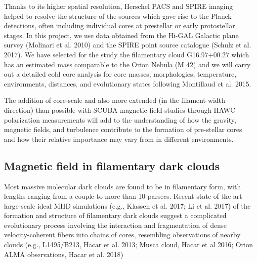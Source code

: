 \documentclass[11pt]{amsart}
\begin{document}
Thanks to its higher spatial resolution, 
Herschel PACS and SPIRE imaging
helped to resolve
the structure of the
sources which gave rise to the Planck detections, often including 
individual cores at prestellar or early protostellar stages.
In this project, we use data obtained from the Hi-GAL Galactic
plane survey (Molinari et al. 2010) and the SPIRE point source catalogue (Schulz et al. 2017). 
We have selected for the study the filamentary cloud G16.97+00.27 which has an estimated mass comparable to the 
Orion Nebula (M 42) and we will carry out a detailed cold core analysis for 
core masses, morphologies, temperature, environments, distances, and evolutionary states following Montillaud et al. 2015.

The addition of core-scale and also more extended (in the filament width direction) than possible with SCUBA magnetic field studies through HAWC+ polarization
measurements will add to the understanding of how the gravity, magnetic
fields, and turbulence contribute to the formation of pre-stellar cores and how their relative importance may vary from
in different environments.

\subsection{Magnetic field in filamentary dark clouds}

Most massive molecular dark clouds are found to be in filamentary form, with lengths ranging from a couple to more than 10 parsecs. 
Recent state-of-the-art large-scale ideal MHD simulations (e.g., Klassen et al. 2017; Li et al. 2017) of the formation and structure 
of filamentary dark clouds suggest a complicated evolutionary process involving the interaction and fragmentation of 
dense velocity-coherent fibers into chains of cores, resembling observations of nearby clouds (e.g., L1495/B213, Hacar et al. 2013; Musca cloud, Hacar et al 2016; 
Orion ALMA observations, Hacar et al. 2018)
\end{document}
